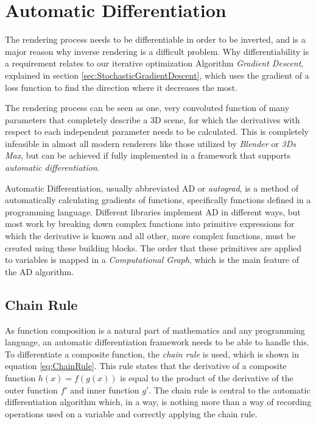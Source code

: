 \section{Automatic Differentiation}\label{sec:AutomaticDifferentiation}

The rendering process needs to be differentiable in order to be inverted, and is a major reason why inverse rendering is a difficult problem. Why differentiability is a requirement relates to our iterative optimization Algorithm \textit{Gradient Descent}, explained in section \ref{sec:StochasticGradientDescent}, which uses the gradient of a loss function to find the direction where it decreases the most.

The rendering process can be seen as one, very convoluted function of many parameters that completely describe a 3D scene, for which the derivatives with respect to each independent parameter needs to be calculated. This is completely infeasible in almost all modern renderers like those utilized by \textit{Blender} or \textit{3Ds Max}, but can be achieved if fully implemented in a framework that supports \textit{automatic differentiation}.

Automatic Differentiation, usually abbreviated AD or \textit{autograd}, is a method of automatically calculating gradients of functions, specifically functions defined in a programming language. Different libraries implement AD in different ways, but most work by breaking down complex functions into primitive expressions for which the derivative is known and all other, more complex functions, must be created using these building blocks. The order that these primitives are applied to variables is mapped in a \textit{Computational Graph}, which is the main feature of the AD algorithm. 

\subsection{Chain Rule}\label{sec:ChainRule}

As function composition is a natural part of mathematics and any programming language, an automatic differentiation framework needs to be able to handle this. To differentiate a composite function, the \textit{chain rule} is used, which is shown in equation \ref{eq:ChainRule}. This rule states that the derivative of a composite function $h(x) = f(g(x))$ is equal to the product of the derivative of the outer function $f'$ and inner function $g'$. The chain rule is central to the automatic differentiation algorithm which, in a way, is nothing more than a way of recording operations used on a variable and correctly applying the chain rule.

